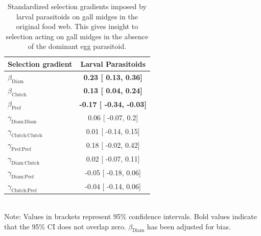 \documentclass[11pt,]{article}
\begin{document}
\begin{table}[h]
\caption{Standardized selection gradients imposed by larval parasitoids on gall midges in the original food web. This gives insight to selection acting on gall midges in the absence of the dominant egg parasitoid.}
\label{Table:LarvalGradients}
\centering
\begin{tabular}{lc}
\\ 
\hline
\textbf{Selection gradient} & \textbf{Larval Parasitoids} \\ %
\hline
$\beta_{\text{Diam}}$ & 
\textbf{
0.23 [
0.13,
0.36] } \\

$\beta_{\text{Clutch}}$ & 
\textbf{
0.13 [
0.04,
0.24] }\\

$\beta_{\text{Pref}}$ &
\textbf{
-0.17 [
-0.34,
-0.03] } \\

$\gamma_{\text{Diam:Diam}}$ &

0.06 [
-0.07,
0.2]  \\

$\gamma_{\text{Clutch:Clutch}}$ & 

0.01 [
-0.14,
0.15] \\

$\gamma_{\text{Pref:Pref}}$ & 

0.18 [
-0.02,
0.42] \\

$\gamma_{\text{Diam:Clutch}}$ & 

0.02 [
-0.07,
0.11]  \\

$\gamma_{\text{Diam:Pref}}$ & 

-0.05 [
-0.18,
0.06]  \\

$\gamma_{\text{Clutch:Pref}}$ & 

-0.04 [
-0.14,
0.06]  \\ 
\hline
\end{tabular}
\bigskip{}
\\
{\footnotesize Note: Values in brackets represent 95\% confidence intervals. Bold values indicate that the 95\% CI does not overlap zero. $\beta_{\text{Diam}}$ has been adjusted for bias.}
\end{table}
\end{document}
